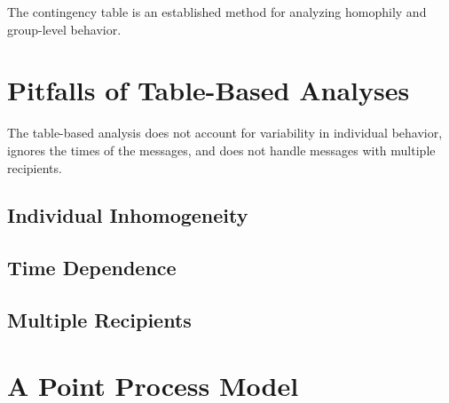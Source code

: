 \documentclass[aoas,preprint]{imsart}
\begin{document}
The contingency table is an established method for analyzing homophily and
group-level behavior.

\section{Pitfalls of Table-Based Analyses}

The table-based analysis does not account for variability in individual
behavior, ignores the times of the messages, and does not handle messages with
multiple recipients.

\subsection{Individual Inhomogeneity}
\subsection{Time Dependence}
\subsection{Multiple Recipients}


\section{A Point Process Model}




\end{document}
